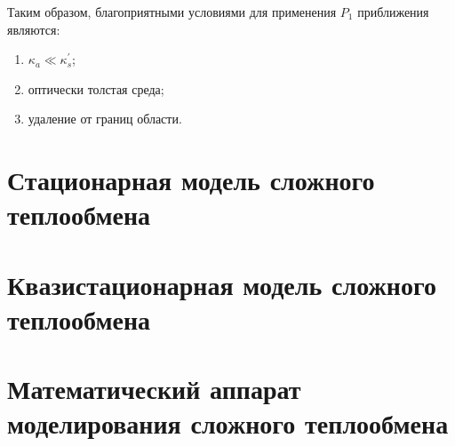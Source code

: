 Таким образом, благоприятными условиями для
применения $P_{1}$ приближения являются:
\begin{enumerate}
\item $\kappa_{a} \ll \kappa_{s}^{\prime}$;

\item оптически толстая среда;

\item удаление от границ области.
\end{enumerate}
\FloatBarrier


\section{Стационарная модель сложного теплообмена}\label{sec:ch1/sec3}


\section{Квазистационарная модель сложного теплообмена}\label{sec:ch1/sec4}


\section{Математический аппарат моделирования сложного теплообмена}\label{sec:ch1/sec5}
